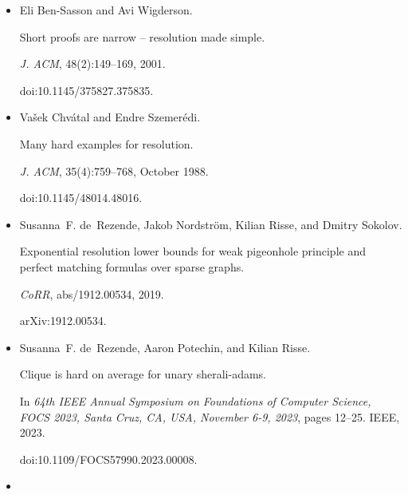 \documentclass[10pt,a4paper]{article}
\begin{document}
\begin{itemize}
In \emph{40th Annual Symposium on Foundations of Computer Science,
FOCS ’99, 17-18 October, 1999, New York, NY, USA}, pages 415–421. IEEE
Computer Society, 1999.


doi:10.1109/SFFCS.1999.814613.





\item[] 
[14]

Eli Ben-Sasson and Avi Wigderson.


Short proofs are narrow – resolution made simple.


\emph{J. ACM}, 48(2):149–169, 2001.


doi:10.1145/375827.375835.





\item[] 
[15]

Vašek Chvátal and Endre Szemerédi.


Many hard examples for resolution.


\emph{J. ACM}, 35(4):759–768, October 1988.


doi:10.1145/48014.48016.





\item[] 
[16]

Susanna F. de Rezende, Jakob Nordström, Kilian Risse, and Dmitry Sokolov.


Exponential resolution lower bounds for weak pigeonhole principle and
perfect matching formulas over sparse graphs.


\emph{CoRR}, abs/1912.00534, 2019.


arXiv:1912.00534.





\item[] 
[17]

Susanna F. de Rezende, Aaron Potechin, and Kilian Risse.


Clique is hard on average for unary sherali-adams.


In \emph{64th IEEE Annual Symposium on Foundations of Computer
Science, FOCS 2023, Santa Cruz, CA, USA, November 6-9, 2023}, pages 12–25.
IEEE, 2023.


doi:10.1109/FOCS57990.2023.00008.





\item[] 
[18]


\end{itemize}
\end{document}
